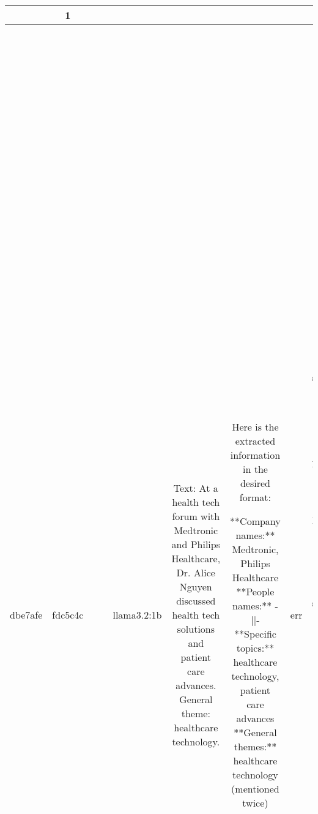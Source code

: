 \begin{table}[h!]
\begin{tabular}{|c|c|c|c|c|c|c|c|c|c|}
{OK & 1\\
\hline
dbe7afe & fdc5c4c &  &  & llama3.2:1b & Text: At a health tech forum with Medtronic and Philips Healthcare, Dr. Alice Nguyen discussed health tech solutions and patient care advances. General theme: healthcare technology. & Here is the extracted information in the desired format:

**Company names:** Medtronic, Philips Healthcare
**People names:** -||-
**Specific topics:** healthcare technology, patient care advances
**General themes:** healthcare technology (mentioned twice) & err & The output appears to follow the desired format outlined in the chatbot description. It lists company names, people names, specific topics, and general themes clearly:

1. **Company names:** There is a comma-separated list of company names.
2. **People names:** The placeholder '-||-' is used correctly to indicate no people names were extracted.
3. **Specific topics:** A comma-separated list of specific topics is identified.
4. **General themes:** A general theme is listed.

However, there is a minor issue with redundancy under "General themes," where "healthcare technology" is repeated in the explanation. This may imply redundancy, but it doesn't strictly violate the format requirement. Despite this repetition, all categories are correctly addressed according to the desired format.

ERR & 1\\
\hline
dbe7afe & fdc5c4c &  &  & gpt-4o-mini & Text: At a health tech forum with Medtronic and Philips Healthcare, Dr. Alice Nguyen discussed health tech solutions and patient care advances. General theme: healthcare technology. & Company names: Medtronic, Philips Healthcare  
People names: Dr. Alice Nguyen  
Specific topics: health tech solutions, patient care advances  
General themes: healthcare technology   & ok & The chatbot output is in the required format as described. The entities are categorized into "Company names," "People names," "Specific topics," and "General themes." The lists of entities are separated by commas within each category, which matches the format specified in the description. Since the compliance does not require verification against the input content, the output format aligns with the stated requirements.

OK & 1\\
\hline
dbe7afe & fdc5c4c &  &  & qwen2.5:3b & Text: At a health tech forum with Medtronic and Philips Healthcare, Dr. Alice Nguyen discussed health tech solutions and patient care advances. General theme: healthcare technology. & Let's extract the entities from each sentence based on your desired format:

}
\end{tabular}
\end{table}
